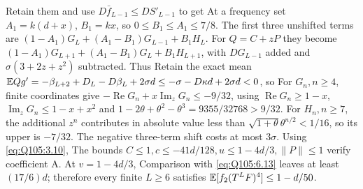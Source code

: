 Retain them and use $D\bar f_{L-1}\le\allowbreak  DS'_{L-1}$ to get
At a frequency set $A_1=\allowbreak k(d+x)$, $B_1=\allowbreak kx$, so
$0\le\allowbreak  B_1\le\allowbreak  A_1\le\allowbreak 7/8$.
The first three unshifted terms are
$(1-A_1)G_L+(A_1-B_1)G_{L-1}+B_1H_L$.
For $Q=\allowbreak C+zP$ they become
$(1-A_1)G_{L+1}+(A_1-B_1)G_L+B_1H_{L+1}$,
with $DG_{L-1}$ added and $\sigma(3+2z+z^2)$ subtracted.
Thus
Retain the exact mean
$\mathbb E Qg'=-\beta_{L+2}+D_L-D\beta_L+2\sigma d
\le-\sigma-D\kappa d+2\sigma d<0$, so
For $G_n,\allowbreak n\ge\allowbreak 4$, finite coordinates give
$-\operatorname{Re}G_n+x\operatorname{Im}_zG_n\le\allowbreak -9/32$,
using $\operatorname{Re}G_n\ge\allowbreak 1-x$,
$\operatorname{Im}_zG_n\le\allowbreak 1-x+x^2$ and
$1-2\theta+\theta^2-\theta^3=\allowbreak 9355/32768>\allowbreak 9/32$.
For $H_n,\allowbreak n\ge\allowbreak 7$, the additional $z^n$ contributes in absolute value
less than $\sqrt{1+\theta}\theta^{n/2}<\allowbreak 1/16$, so its upper is $-7/32$.
The negative three-term shift costs at most $3\sigma$.
Using \eqref{eq:Q105:3.10},
The bounds $C\le\allowbreak 1,\allowbreak c\le\allowbreak -41d/128,\allowbreak u\le\allowbreak 1-4d/3,\allowbreak \|P\|\le\allowbreak 1$ verify
coefficient A. At $v=\allowbreak 1-4d/3$,
Comparison with \eqref{eq:Q105:6.13} leaves at least $(17/6)d$;
therefore every finite $L\ge\allowbreak 6$ satisfies
$\mathbb E[f_2(T^LF)^4]\le\allowbreak 1-d/50$.

